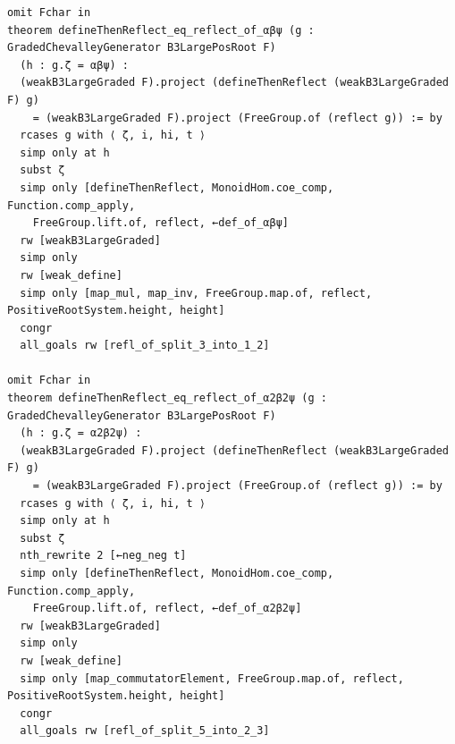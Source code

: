 \begin{Verbatim}
omit Fchar in
theorem defineThenReflect_eq_reflect_of_αβψ (g : GradedChevalleyGenerator B3LargePosRoot F)
  (h : g.ζ = αβψ) :
  (weakB3LargeGraded F).project (defineThenReflect (weakB3LargeGraded F) g)
    = (weakB3LargeGraded F).project (FreeGroup.of (reflect g)) := by
  rcases g with ⟨ ζ, i, hi, t ⟩
  simp only at h
  subst ζ
  simp only [defineThenReflect, MonoidHom.coe_comp, Function.comp_apply,
    FreeGroup.lift.of, reflect, ←def_of_αβψ]
  rw [weakB3LargeGraded]
  simp only
  rw [weak_define]
  simp only [map_mul, map_inv, FreeGroup.map.of, reflect, PositiveRootSystem.height, height]
  congr
  all_goals rw [refl_of_split_3_into_1_2]

omit Fchar in
theorem defineThenReflect_eq_reflect_of_α2β2ψ (g : GradedChevalleyGenerator B3LargePosRoot F)
  (h : g.ζ = α2β2ψ) :
  (weakB3LargeGraded F).project (defineThenReflect (weakB3LargeGraded F) g)
    = (weakB3LargeGraded F).project (FreeGroup.of (reflect g)) := by
  rcases g with ⟨ ζ, i, hi, t ⟩
  simp only at h
  subst ζ
  nth_rewrite 2 [←neg_neg t]
  simp only [defineThenReflect, MonoidHom.coe_comp, Function.comp_apply,
    FreeGroup.lift.of, reflect, ←def_of_α2β2ψ]
  rw [weakB3LargeGraded]
  simp only
  rw [weak_define]
  simp only [map_commutatorElement, FreeGroup.map.of, reflect, PositiveRootSystem.height, height]
  congr
  all_goals rw [refl_of_split_5_into_2_3]
\end{Verbatim}
